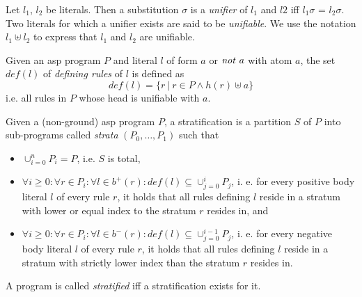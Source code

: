 
\begin{definition}[Unification]
\label{def:prelims-asp-semantics-unification}
Let $l_1$, $l_2$ be literals. Then a substitution $\sigma$ is a \emph{unifier} of $l_1$ and $l2$ iff $l_{1}\sigma$ = $l_{2}\sigma$. Two literals for which a unifier exists are said to be \emph{unifiable}. We use the notation $l_1 \uplus l_2$ to express that $l_1$ and $l_2$ are unifiable.
\end{definition}

\begin{definition}
\label{def:prelims-asp-semantics}
Given an \gls{asp} program $P$ and literal $l$ of form $a$ or $\mathit{not}\ a$ with atom $a$, the set $\mathit{def}(l)$ of \emph{defining rules} of $l$ is defined as
\[
	\mathit{def}(l) = \{ r\ |\ r \in P \land h(r) \uplus a \}
\]
i.e. all rules in $P$ whose head is unifiable with $a$.
\end{definition}

\begin{definition}
\label{def:prelims-asp-semantics-stratification}
Given a (non-ground) \gls{asp} program $P$, a stratification is a partition $S$ of $P$ into sub-programs called \emph{strata} $(P_0,\ldots,P_1)$ such that
\begin{itemize}
	\item $\cup^{n}_{i = 0} P_i = P$, i.e. $S$ is total,
	\item $\forall i \geq 0: \forall r \in P_i: \forall l \in b^{+}(r): \mathit{def}(l) \subseteq \cup^{i}_{j = 0} P_j$, i. e. for every positive body literal $l$ of every rule $r$, it holds that all rules defining $l$ reside in a stratum with lower or equal index to the stratum $r$ resides in, and
	\item $\forall i \geq 0: \forall r \in P_i: \forall l \in b^{-}(r): \mathit{def}(l) \subseteq \cup^{i - 1}_{j = 0} P_j$, i. e. for every negative body literal $l$ of every rule $r$, it holds that all rules defining $l$ reside in a stratum with strictly lower index than the stratum $r$ resides in.
\end{itemize}
A program is called \emph{stratified} iff a stratification exists for it.
\end{definition}

